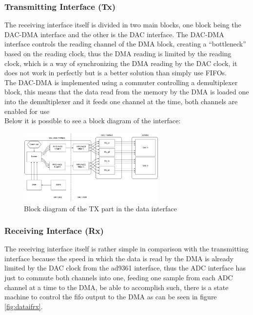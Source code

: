 \subsubsection{Transmitting Interface (Tx)}

The receiving interface itself is divided in two main blocks, one block being the
DAC-DMA interface and the other is the DAC interface. The DAC-DMA interface controls
the reading channel of the DMA block, creating a “bottleneck” based on the reading
clock, thus the DMA reading is limited by the reading clock, which is a way of
synchronizing the DMA reading by the DAC clock, it does not work in perfectly but
is a better solution than simply use FIFOs. \\

The DAC-DMA is implemented using a commuter controlling a demultiplexer block,
this means that the data read from the memory by the DMA is loaded one into the
demultiplexer and it feeds one channel at the time, both channels are enabled
for use\\

Below it is possible to see a block diagram of the interface:

\begin{figure}[htbp]
    \centering
    \includegraphics[width=0.65\textwidth]{./figures/txdata_if}
    \caption{ Block diagram of the TX part in the data interface
    \label{fig:dataiftx}}
\end{figure}

\subsubsection{Receiving Interface (Rx)}

The receiving interface itself is rather simple in comparison with the
transmitting interface because the speed in which the data is read by the DMA is
already limited by the DAC clock from the ad9361 interface, thus the ADC
interface has just to commute both channels into one, feeding one sample from
each ADC channel at a time to the DMA, be able to accomplish such, there is a
state machine to control the fifo output to the DMA as can be seen in figure
\ref{fig:dataifrx}.\\

